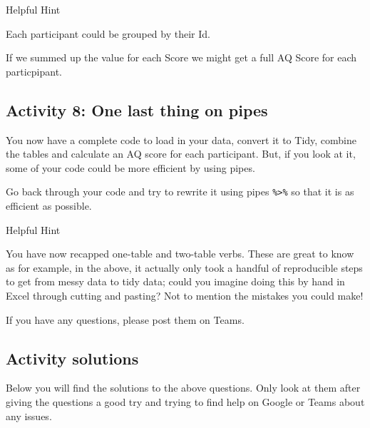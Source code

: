 \documentclass[]{book}
\newenvironment{Shaded}{\begin{snugshade}}{\end{snugshade}}
\newcommand{\CommentTok}[1]{\textcolor[rgb]{0.56,0.35,0.01}{\textit{#1}}}
\newcommand{\DataTypeTok}[1]{\textcolor[rgb]{0.13,0.29,0.53}{#1}}
\newcommand{\KeywordTok}[1]{\textcolor[rgb]{0.13,0.29,0.53}{\textbf{#1}}}
\newcommand{\NormalTok}[1]{#1}
\newcommand{\OperatorTok}[1]{\textcolor[rgb]{0.81,0.36,0.00}{\textbf{#1}}}
\newcommand{\OtherTok}[1]{\textcolor[rgb]{0.56,0.35,0.01}{#1}}
\newcommand{\StringTok}[1]{\textcolor[rgb]{0.31,0.60,0.02}{#1}}
\begin{document}
\begin{Shaded}
\end{Shaded}

Helpful Hint

Each participant could be grouped by their Id.

If we summed up the value for each Score we might get a full AQ Score for each particpipant.

\hypertarget{activity-8-one-last-thing-on-pipes}{%
\subsection{Activity 8: One last thing on pipes}\label{activity-8-one-last-thing-on-pipes}}

You now have a complete code to load in your data, convert it to Tidy, combine the tables and calculate an AQ score for each participant. But, if you look at it, some of your code could be more efficient by using pipes.

Go back through your code and try to rewrite it using pipes \texttt{\%\textgreater{}\%} so that it is as efficient as possible.

Helpful Hint

You have now recapped one-table and two-table verbs. These are great to know as for example, in the above, it actually only took a handful of reproducible steps to get from messy data to tidy data; could you imagine doing this by hand in Excel through cutting and pasting? Not to mention the mistakes you could make!

If you have any questions, please post them on Teams.

\hypertarget{activity-solutions-1}{%
\subsection{Activity solutions}\label{activity-solutions-1}}

Below you will find the solutions to the above questions. Only look at them after giving the questions a good try and trying to find help on Google or Teams about any issues.
\end{document}
